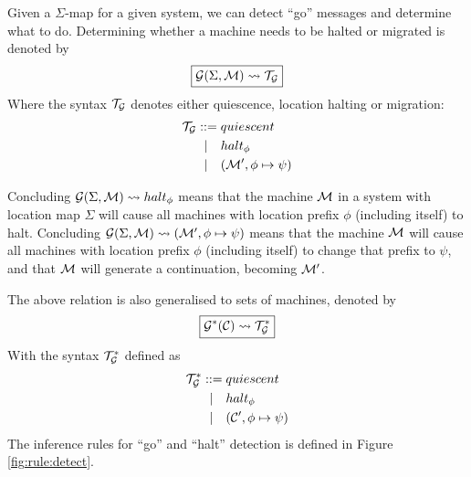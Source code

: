 Given a $\Sigma$-map for a given system, we can detect ``go'' messages and
determine what to do. Determining whether a machine needs to be halted or
migrated is denoted by
\begin{equation*}
\boxed{\mathcal{G}(\Sigma, \mathcal{M}) \leadsto \mathcal{T}_{\mathcal{G}}}
\end{equation*}
Where the syntax $\mathcal{T}_{\mathcal{G}}$ denotes either quiescence, location halting or
migration:
\begin{align*}
  \mathcal{T}_{\mathcal{G}} ::={}& quiescent \\
       |\quad& halt_\phi \\
       |\quad& (\mathcal{M}', \phi \mapsto \psi)
\end{align*}

Concluding $\mathcal{G}(\Sigma, \mathcal{M}) \leadsto halt_\phi$ means that the machine $\mathcal{M}$ in a
system with location map $\Sigma$ will cause all machines with location prefix
$\phi$ (including itself) to halt. Concluding $\mathcal{G}(\Sigma,\mathcal{M}) \leadsto (\mathcal{M}', \phi
\mapsto \psi)$ means that the machine $\mathcal{M}$ will cause all machines with location
prefix $\phi$ (including itself) to change that prefix to $\psi$, and that $\mathcal{M}$
will generate a continuation, becoming $\mathcal{M}'$.

The above relation is also generalised to sets of machines, denoted by
\begin{equation*}
\boxed{\mathcal{G}^*(\mathcal{C}) \leadsto \mathcal{T}_{\mathcal{G}}^*}
\end{equation*}
With the syntax $\mathcal{T}_{\mathcal{G}}^*$ defined as
\begin{align*}
  \mathcal{T}_{\mathcal{G}}^* ::={}& quiescent \\
         |\quad& halt_\phi \\
         |\quad& (\mathcal{C}', \phi \mapsto \psi)
\end{align*}
The inference rules for ``go'' and ``halt'' detection is defined in Figure
\ref{fig:rule:detect}.


